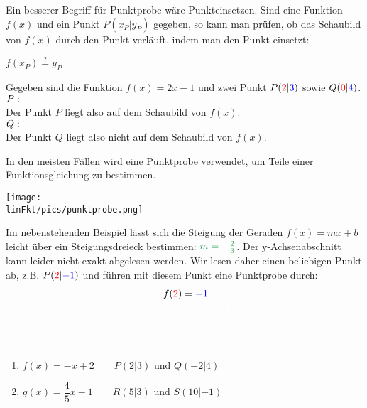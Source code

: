 Ein besserer Begriff für Punktprobe wäre Punkteinsetzen. Sind eine Funktion $f(x)$ und ein Punkt $P(x_P|y_P)$ gegeben, so kann man prüfen, ob das Schaubild von $f(x)$ durch den Punkt verläuft, indem man den Punkt einsetzt:
\begin{tcolorbox}
	\centering
	\textcolor{loestc}{$f(x_P)\overset{?}{=}y_P$}
\end{tcolorbox}
\begin{bsp}
	Gegeben sind die Funktion $f(x)=2x-1$ und zwei Punkt $P(\textcolor{red}{2}|\textcolor{blue}{3})$ sowie $Q(\textcolor{red}{0}|\textcolor{blue}{4})$.\\
	$P:\ \textcolor{loes}{f(2)=2\cdot 2-1=4-1=3=3}$\\
	Der Punkt $P$ liegt also auf dem Schaubild von $f(x)$.\\
	$Q:\ \textcolor{loes}{f(0)=2\cdot 0-1=0-1=-1\neq4}$\\
	Der Punkt $Q$ liegt also nicht auf dem Schaubild von $f(x)$.
\end{bsp}
In den meisten Fällen wird eine Punktprobe verwendet, um Teile einer Funktionsgleichung zu bestimmen.\vspace{0.5em}\\
\begin{minipage}{0.5\textwidth}
	\texttt{[image: \\linFkt/pics/punktprobe.png]}
\end{minipage}
\begin{minipage}{0.5\textwidth}
	Im nebenstehenden Beispiel lässt sich die Steigung der Geraden $f(x)=mx+b$ leicht über ein Steigungsdreieck bestimmen: $\textcolor{ForestGreen}{m=-\tfrac{2}{3}}$. Der y-Achsenabschnitt kann leider nicht exakt abgelesen werden. Wir lesen daher einen beliebigen Punkt ab, z.B. $P(\textcolor{red}{2}|\textcolor{blue}{-1})$ und führen mit diesem Punkt eine Punktprobe durch:
	\begin{align*}
		f(\textcolor{red}{2})&=\textcolor{blue}{-1}\\
		\textcolor{loes}{-\dfrac{2}{3}\cdot2+b}&\textcolor{loes}{=-1\ \vert+\dfrac{4}{3}}\\
		\textcolor{loes}{b}&\textcolor{loes}{=\dfrac{1}{3}}
	\end{align*}

\end{minipage}
\begin{Exercise}[title={Prüfe, ob die Punkte auf dem Schaubild der Funktion liegen}, label=punktprobeA1]
	\begin{enumerate}[label=\alph*)]
		\item $f(x)=-x+2\qquad P(2|3)\text{ und }Q(-2|4)$
		\item $g(x)=\dfrac{4}{5}x-1\qquad R(5|3)\text{ und }S(10|-1)$
	\end{enumerate}
\end{Exercise}
